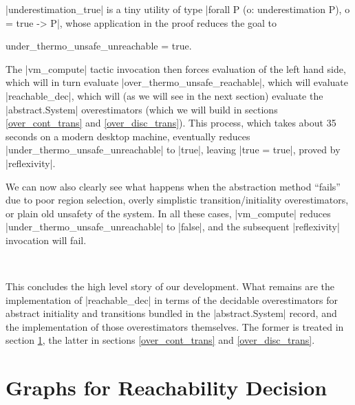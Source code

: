 \documentclass[runningheads]{llncs}
\begin{document}
|underestimation_true| is a tiny utility of type |forall P (o: underestimation P), o = true -> P|, whose application in the proof reduces the goal to
\begin{code}under_thermo_unsafe_unreachable = true.\end{code} The |vm_compute| tactic invocation then forces evaluation of the left hand side, which will in turn evaluate |over_thermo_unsafe_reachable|, which will evaluate |reachable_dec|, which will (as we will see in the next section) evaluate the |abstract.System| overestimators (which we will build in sections \ref{over_cont_trans} and \ref{over_disc_trans}). This process, which takes about 35 seconds on a modern desktop machine, eventually reduces |under_thermo_unsafe_unreachable| to |true|, leaving |true = true|, proved by |reflexivity|.

We can now also clearly see what happens when the abstraction method ``fails'' due to poor region selection, overly simplistic transition/initiality overestimators, or plain old unsafety of the system. In all these cases, |vm_compute| reduces |under_thermo_unsafe_unreachable| to |false|, and the subsequent |reflexivity| invocation will fail.


\

This concludes the high level story of our development. What remains are the implementation of |reachable_dec| in terms of the decidable overestimators for abstract initiality and transitions bundled in the |abstract.System| record, and the implementation of those overestimators themselves. The former is treated in section \ref{graphs}, the latter in sections \ref{over_cont_trans} and \ref{over_disc_trans}.



\section{Graphs for Reachability Decision}
\label{graphs}
\end{document}
